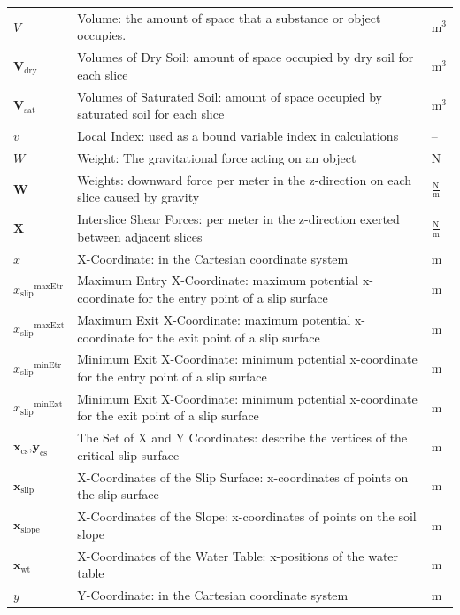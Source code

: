 \documentclass[12pt]{article}
\begin{document}
\begin{longtabu}{l X[l] l}
\\
$V$ & Volume: the amount of space that a substance or object occupies. & $\text{m}^{3}$
\\
${\mathbf{V}_{\text{dry}}}$ & Volumes of Dry Soil: amount of space occupied by dry soil for each slice & $\text{m}^{3}$
\\
${\mathbf{V}_{\text{sat}}}$ & Volumes of Saturated Soil: amount of space occupied by saturated soil for each slice & $\text{m}^{3}$
\\
$v$ & Local Index: used as a bound variable index in calculations & --
\\
$W$ & Weight: The gravitational force acting on an object & N
\\
$\mathbf{W}$ & Weights: downward force per meter in the z-direction on each slice caused by gravity & $\frac{\text{N}}{\text{m}}$
\\
$\mathbf{X}$ & Interslice Shear Forces: per meter in the z-direction exerted between adjacent slices & $\frac{\text{N}}{\text{m}}$
\\
$x$ & X-Coordinate: in the Cartesian coordinate system & m
\\
${{x_{\text{slip}}}^{\text{maxEtr}}}$ & Maximum Entry X-Coordinate: maximum potential x-coordinate for the entry point of a slip surface & m
\\
${{x_{\text{slip}}}^{\text{maxExt}}}$ & Maximum Exit X-Coordinate: maximum potential x-coordinate for the exit point of a slip surface & m
\\
${{x_{\text{slip}}}^{\text{minEtr}}}$ & Minimum Exit X-Coordinate: minimum potential x-coordinate for the entry point of a slip surface & m
\\
${{x_{\text{slip}}}^{\text{minExt}}}$ & Minimum Exit X-Coordinate: minimum potential x-coordinate for the exit point of a slip surface & m
\\
${\mathbf{x}_{\text{cs}}}\text{,}{\mathbf{y}_{\text{cs}}}$ & The Set of X and Y Coordinates: describe the vertices of the critical slip surface & m
\\
${\mathbf{x}_{\text{slip}}}$ & X-Coordinates of the Slip Surface: x-coordinates of points on the slip surface & m
\\
${\mathbf{x}_{\text{slope}}}$ & X-Coordinates of the Slope: x-coordinates of points on the soil slope & m
\\
${\mathbf{x}_{\text{wt}}}$ & X-Coordinates of the Water Table: x-positions of the water table & m
\\
$y$ & Y-Coordinate: in the Cartesian coordinate system & m

\end{longtabu}
\end{document}
